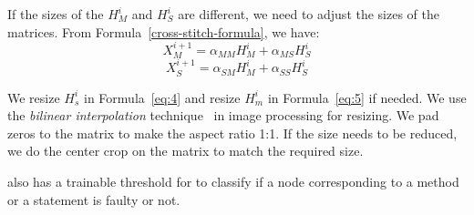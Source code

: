 

If the sizes of the $H_M^{i}$ and $H_S^{i}$ are different, we need to adjust the sizes of the matrices. From Formula~\ref{cross-stitch-formula}, we have:
\begin{equation}\label{eq:4}
	X_M^{i+1} = \alpha_{MM}H_M^{i} + \alpha_{MS}H_S^{i}
\end{equation}
\begin{equation}\label{eq:5}
  X_S^{i+1} = \alpha_{SM}H_M^{i} + \alpha_{SS}H_S^{i}
\end{equation}


We resize $H_s^{i}$ in Formula~\ref{eq:4} and resize $H_m^{i}$ in
Formula~\ref{eq:5} if needed. We use the {\em bilinear interpolation}
technique~\cite{bilinear-interpolation} in image processing for
resizing. We pad zeros to the matrix to make the aspect ratio 1:1. If
the size needs to be reduced, we do the center crop on the matrix to
match the required size.

{\tool} also has a trainable threshold for  to classify
if a node corresponding to a method or a statement is faulty or not.


